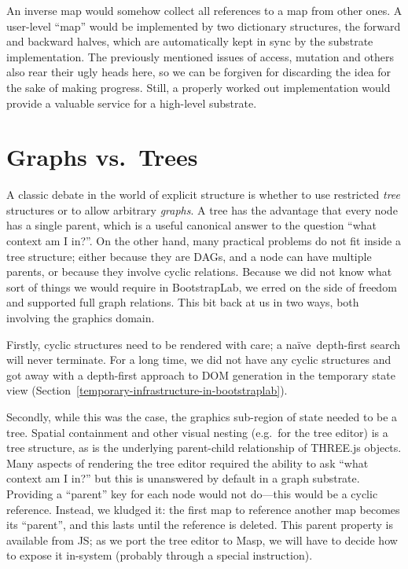 \documentclass[ twoside,openright,titlepage,numbers=noenddot,headinclude,footinclude,cleardoublepage=empty,abstract=on,
                BCOR=5mm,paper=a4,fontsize=11pt
                ]{scrreprt}
\newcommand{\naive}{na\"ive}
\theoremstyle{definition}
\begin{document}
An inverse map would somehow collect all references to a map from other
ones. A user-level ``map'' would be implemented by two dictionary
structures, the forward and backward halves, which are automatically
kept in sync by the substrate implementation. The previously mentioned
issues of access, mutation and others also rear their ugly heads here,
so we can be forgiven for discarding the idea for the sake of making
progress. Still, a properly worked out implementation would provide a
valuable service for a high-level substrate.

\hypertarget{graphs-vs.-trees}{\section{Graphs vs.~Trees}\label{graphs-vs.-trees}}

A classic debate in the world of explicit structure is whether to use
restricted \emph{tree} structures or to allow arbitrary \emph{graphs}. A
tree has the advantage that every node has a single parent, which is a
useful canonical answer to the question ``what context am I in?''. On
the other hand, many practical problems do not fit inside a tree
structure; either because they are DAGs, and a node can have multiple
parents, or because they involve cyclic relations. Because we did not
know what sort of things we would require in BootstrapLab, we erred on
the side of freedom and supported full graph relations. This bit back at
us in two ways, both involving the graphics domain.

Firstly, cyclic structures need to be rendered with care; a
\naive~depth-first search will never terminate. For a long time, we did
not have any cyclic structures and got away with a depth-first approach
to \ac{DOM} generation in the temporary state view
(Section~\ref{temporary-infrastructure-in-bootstraplab}).

Secondly, while this was the case, the graphics sub-region of state
needed to be a tree. Spatial containment and other visual nesting
(e.g.~for the tree editor) is a tree structure, as is the underlying
parent-child relationship of THREE.js objects. Many aspects of rendering
the tree editor required the ability to ask ``what context am I in?''
but this is unanswered by default in a graph substrate. Providing a
``parent'' key for each node would not do---this would be a cyclic
reference. Instead, we kludged it: the first map to reference another
map becomes its ``parent'', and this lasts until the reference is
deleted. This parent property is available from \ac{JS}; as we port the
tree editor to Masp, we will have to decide how to expose it in-system
(probably through a special instruction).
\end{document}
